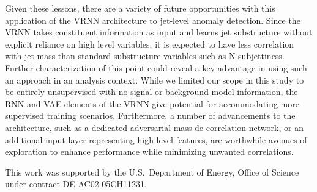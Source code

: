 \documentclass[letterpaper,11pt]{article}
\begin{document}
Given these lessons, there are a variety of future opportunities with this application of the VRNN architecture to jet-level anomaly detection. 
Since the VRNN takes constituent information as input and learns jet substructure without explicit reliance on high level variables, it is expected to have less correlation with jet mass than standard substructure variables such as N-subjettiness. Further characterization of this point could reveal a key advantage in using such an approach in an analysis context.
While we limited our scope in this study to be entirely unsupervised with no signal or background model information, the RNN and VAE elements of the VRNN give potential for accommodating more supervised training scenarios. 
Furthermore, a number of advancements to the architecture, such as a dedicated adversarial mass de-correlation network, or an additional input layer representing high-level features, are worthwhile avenues of exploration to enhance performance while minimizing unwanted correlations. 




\acknowledgments

This work was supported by the U.S.~Department of Energy, Office of Science under contract DE-AC02-05CH11231. 




%

\end{document}
